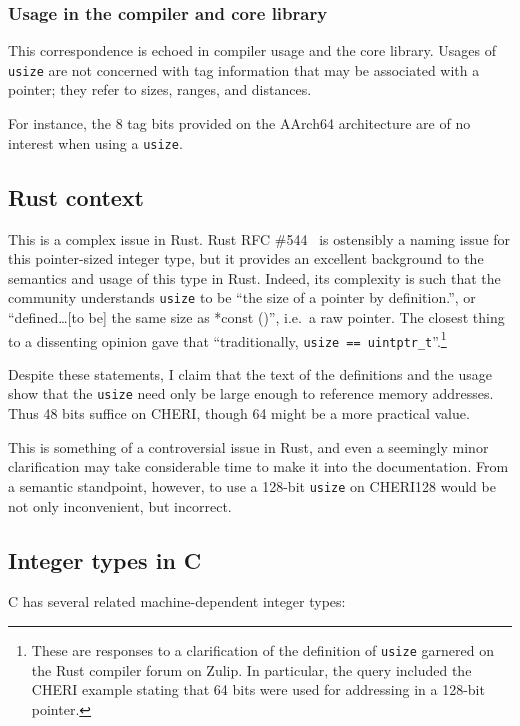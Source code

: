 \documentclass[dissertation.tex]{subfiles}
\begin{document}
\subsubsection{Usage in the compiler and core library}
This correspondence is echoed in compiler usage and the core library.
Usages of \texttt{usize} are not concerned with tag information that may
be associated with a pointer; they refer to sizes, ranges, and
distances.

For instance, the 8 tag bits provided on the AArch64 architecture are of
no interest when using a \texttt{usize}.


\subsection{Rust context}
This is a complex issue in Rust.
Rust RFC \#544~\cite{rust-rfc-isize} is ostensibly a naming issue for
this pointer-sized integer type, but it provides an excellent background
to the semantics and usage of this type in Rust.
Indeed, its complexity is such that the community understands
\texttt{usize} to be ``the size of a pointer by definition.'', or
``defined\ldots[to be] the same size as *const ()'', i.e.\ a raw
pointer.
The closest thing to a dissenting opinion gave that ``traditionally,
\texttt{usize == uintptr\_t}''.\footnote{
These are responses to a clarification of the definition of
\texttt{usize} garnered on the Rust compiler forum on Zulip.
In particular, the query included the CHERI example stating that 64 bits
were used for addressing in a 128-bit pointer.
}

Despite these statements, I claim that the text of the definitions and
the usage show that the \texttt{usize} need only be large enough to
reference memory addresses.
Thus 48 bits suffice on CHERI, though 64 might be a more practical
value.

This is something of a controversial issue in Rust, and even a seemingly
minor clarification may take considerable time to make it into the
documentation.
From a semantic standpoint, however, to use a 128-bit \texttt{usize} on
CHERI128 would be not only inconvenient, but incorrect.


\subsection{Integer types in C}
C has several related machine-dependent integer types:
\end{document}
